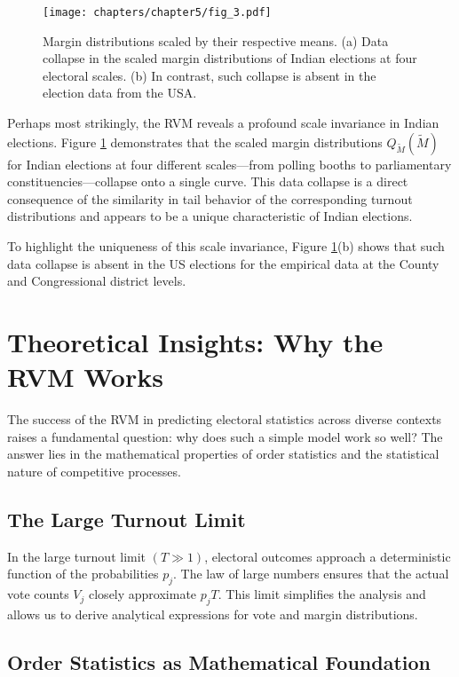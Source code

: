 \begin{figure}[h]
    \centering
    \texttt{[image: chapters/chapter5/fig\_3.pdf]}
    \caption{Margin distributions scaled by their respective means. (a) Data collapse in the scaled margin distributions of Indian elections at four electoral scales. (b) In contrast, such collapse is absent in the election data from the USA.}
    \label{fig:3}
\end{figure}

Perhaps most strikingly, the RVM reveals a profound scale invariance in Indian elections. Figure \ref{fig:3} demonstrates that the scaled margin distributions $Q_{\widetilde{M}}(\widetilde{M})$ for Indian elections at four different scales—from polling booths to parliamentary constituencies—collapse onto a single curve. This data collapse is a direct consequence of the similarity in tail behavior of the corresponding turnout distributions and appears to be a unique characteristic of Indian elections.

To highlight the uniqueness of this scale invariance, Figure \ref{fig:3}(b) shows that such data collapse is absent in the US elections for the empirical data at the County and Congressional district levels.

\section{Theoretical Insights: Why the RVM Works}

The success of the RVM in predicting electoral statistics across diverse contexts raises a fundamental question: why does such a simple model work so well? The answer lies in the mathematical properties of order statistics and the statistical nature of competitive processes.

\subsection{The Large Turnout Limit}

In the large turnout limit $(T \gg 1)$, electoral outcomes approach a deterministic function of the probabilities $p_j$. The law of large numbers ensures that the actual vote counts $V_j$ closely approximate $p_j T$. This limit simplifies the analysis and allows us to derive analytical expressions for vote and margin distributions.

\subsection{Order Statistics as Mathematical Foundation}

